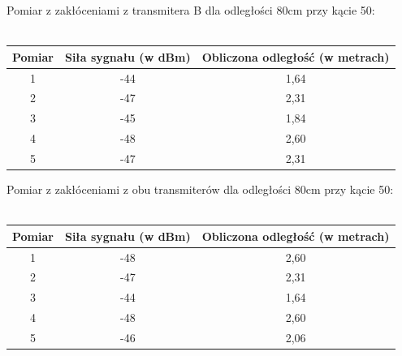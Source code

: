 \begin{center}
	\begin{minipage}{\linewidth}
		Pomiar z zakłóceniami z transmitera B dla odległości 80cm przy kącie 50\textdegree :\\\\
		\begin{tabular}{|c|c|c|}
			\hline 
			Pomiar & Siła sygnału (w dBm) & Obliczona odległość (w metrach) \\ 
			\hline 
			1 & -44 & 1,64 \\ 
			\hline 
			2 & -47 & 2,31 \\ 
			\hline 
			3 & -45 & 1,84 \\ 
			\hline 
			4 & -48 & 2,60 \\ 
			\hline 
			5 & -47 & 2,31 \\ 
			\hline 
		\end{tabular}
	\end{minipage} 
\end{center}
\begin{center}
	\begin{minipage}{\linewidth}
		Pomiar z zakłóceniami z obu transmiterów dla odległości 80cm przy kącie 50\textdegree :\\\\
		\begin{tabular}{|c|c|c|}
			\hline 
			Pomiar & Siła sygnału (w dBm) & Obliczona odległość (w metrach) \\ 
			\hline 
			1 & -48 & 2,60 \\ 
			\hline 
			2 & -47 & 2,31 \\ 
			\hline 
			3 & -44 & 1,64 \\ 
			\hline 
			4 & -48 & 2,60 \\ 
			\hline 
			5 & -46 & 2,06 \\ 
			\hline 
		\end{tabular}
	\end{minipage} 
\end{center}